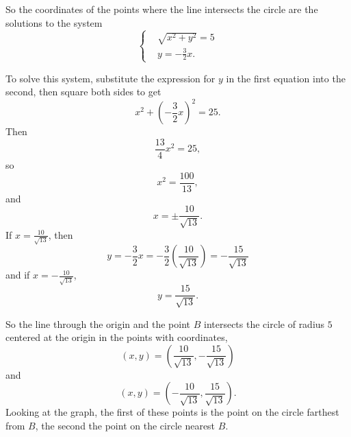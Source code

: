 \documentclass{ximera}
\begin{document}
\begin{question}
\begin{explanation}
So the coordinates of the points where the line intersects the circle are the solutions to the system
\[
  \begin{cases}
  & \sqrt{x^2 + y^2} = 5 \\
  & y = -\frac{3}{2}x .
\end{cases}
\]

To solve this system, substitute the expression for $y$ in the first equation into the second, then square both sides to get
\[
   x^2 + \left( -\frac{3}{2}x \right)^2 = 25.
\]
Then
\[
  \frac{13}{4}x^2 = 25 ,
\]
so
\[
    x^2 = \frac{100}{13},
\]
and 
\[
  x = \pm \frac{10}{\sqrt{13}}.
\]
If $x=\frac{10}{\sqrt{13}}$, then
\[
    y = -\frac{3}{2}x = -\frac{3}{2} \left(\frac{10}{\sqrt{13}}  \right) = -\frac{15}{\sqrt{13}}
\]
and if $x=-\frac{10}{\sqrt{13}}$,
\[
   y = \frac{15}{\sqrt{13}}.
\]

So the line through the origin and the point $B$ intersects the circle of radius $5$ centered at the origin in the points with coordinates,
\[
 (x,y) = \left(\frac{10}{\sqrt{13}} , -\frac{15}{\sqrt{13}}  \right) 
\]
and
\[
  (x,y) = \left(-\frac{10}{\sqrt{13}} , \frac{15}{\sqrt{13}}  \right).
\]
Looking at the graph, the first of these points is the point on the circle farthest from $B$, the second the point on the circle nearest $B$.
\end{explanation}

\end{question}
\end{document}
